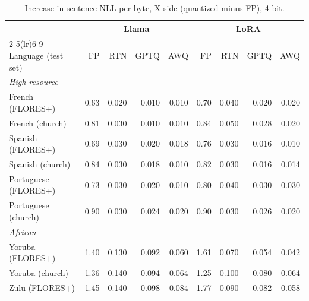 \begin{table}[htbp]
\centering
\footnotesize
\setlength{\tabcolsep}{3pt}
\caption{Increase in sentence NLL per byte, X side (quantized minus FP), 4-bit.}
\begin{tabular}{lrrrrrrrr}
\toprule
 & \multicolumn{4}{c}{Llama} & \multicolumn{4}{c}{LoRA} \\
\cmidrule(lr){2-5}\cmidrule(lr){6-9}
Language (test set) & FP & RTN & GPTQ & AWQ & FP & RTN & GPTQ & AWQ \\
\midrule
\multicolumn{9}{l}{\textit{High-resource}} \\
French (FLORES+) & 0.63 & \cellcolor{loss!5}0.020 & \cellcolor{loss!2}0.010 & \cellcolor{loss!2}0.010 & 0.70 & \cellcolor{loss!9}0.040 & \cellcolor{loss!5}0.020 & \cellcolor{loss!5}0.020 \\
French (church) & 0.81 & \cellcolor{loss!7}0.030 & \cellcolor{loss!2}0.010 & \cellcolor{loss!2}0.010 & 0.84 & \cellcolor{loss!12}0.050 & \cellcolor{loss!6}0.028 & \cellcolor{loss!5}0.020 \\
Spanish (FLORES+) & 0.69 & \cellcolor{loss!7}0.030 & \cellcolor{loss!5}0.020 & \cellcolor{loss!4}0.018 & 0.76 & \cellcolor{loss!7}0.030 & \cellcolor{loss!4}0.016 & \cellcolor{loss!2}0.010 \\
Spanish (church) & 0.84 & \cellcolor{loss!7}0.030 & \cellcolor{loss!4}0.018 & \cellcolor{loss!2}0.010 & 0.82 & \cellcolor{loss!7}0.030 & \cellcolor{loss!4}0.016 & \cellcolor{loss!3}0.014 \\
Portuguese (FLORES+) & 0.73 & \cellcolor{loss!7}0.030 & \cellcolor{loss!5}0.020 & \cellcolor{loss!2}0.010 & 0.80 & \cellcolor{loss!9}0.040 & \cellcolor{loss!7}0.030 & \cellcolor{loss!7}0.030 \\
Portuguese (church) & 0.90 & \cellcolor{loss!7}0.030 & \cellcolor{loss!6}0.024 & \cellcolor{loss!5}0.020 & 0.90 & \cellcolor{loss!7}0.030 & \cellcolor{loss!6}0.026 & \cellcolor{loss!5}0.020 \\
\midrule \multicolumn{9}{l}{\textit{African}} \\
Yoruba (FLORES+) & 1.40 & \cellcolor{loss!30}0.130 & \cellcolor{loss!21}0.092 & \cellcolor{loss!14}0.060 & 1.61 & \cellcolor{loss!16}0.070 & \cellcolor{loss!12}0.054 & \cellcolor{loss!10}0.042 \\
Yoruba (church) & 1.36 & \cellcolor{loss!32}0.140 & \cellcolor{loss!22}0.094 & \cellcolor{loss!15}0.064 & 1.25 & \cellcolor{loss!23}0.100 & \cellcolor{loss!18}0.080 & \cellcolor{loss!15}0.064 \\
Zulu (FLORES+) & 1.45 & \cellcolor{loss!32}0.140 & \cellcolor{loss!23}0.098 & \cellcolor{loss!19}0.084 & 1.77 & \cellcolor{loss!21}0.090 & \cellcolor{loss!19}0.082 & \cellcolor{loss!13}0.058 \\

\end{tabular}
\end{table}
